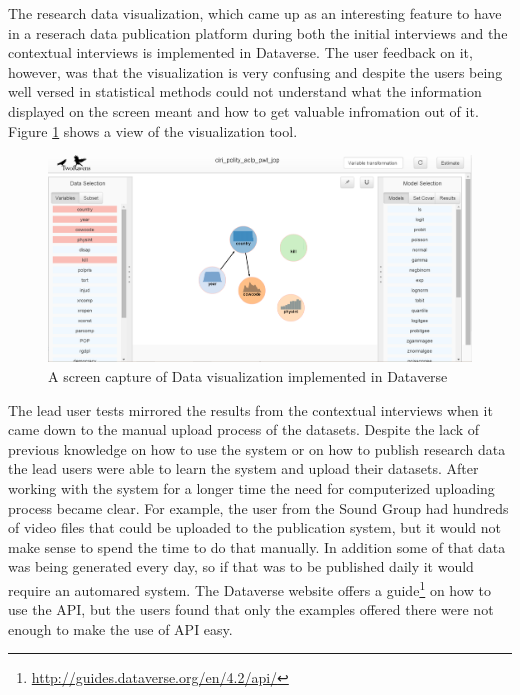 The research data visualization, which came up as an interesting feature to
have in a reserach data publication platform during both the initial interviews
and the contextual interviews is implemented in Dataverse. The user feedback
on it, however, was that the visualization is very confusing and despite the
users being well versed in statistical methods could not understand what the
information displayed on the screen meant and how to get valuable infromation
out of it. Figure \ref{fig:tworavens} shows a view of the visualization tool.

\begin{figure}
    \begin{centering}
        \includegraphics[width=\textwidth]{images/tworavens}
    \end{centering}
    \caption{A screen capture of Data visualization implemented in Dataverse}
    \label{fig:tworavens}
\end{figure}


The lead user tests mirrored the results from the contextual interviews when
it came down to the manual upload process of the datasets. Despite the lack of
previous knowledge on how to use the system or on how to publish research data
the lead users were able to learn the system and upload their datasets. After
working with the system for a longer time the need for computerized uploading
process became clear. For example, the user from the Sound Group had hundreds
of video files that could be uploaded to the publication system, but it would
not make sense to spend the time to do that manually. In addition some of that
data was being generated every day, so if that was to be published daily it
would require an automared system. The Dataverse website offers a
guide\footnote{\url{http://guides.dataverse.org/en/4.2/api/}} on how
to use the API, but the users found that only the examples offered there were
not enough to make the use of API easy.

